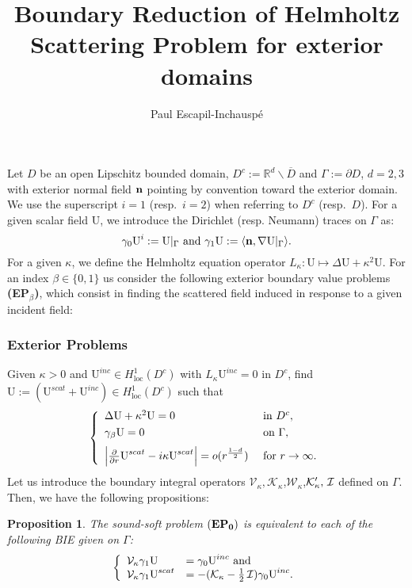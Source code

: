 \documentclass[1pt]{article}
\title{Boundary Reduction of Helmholtz Scattering Problem for exterior domains}
\author{Paul Escapil-Inchausp\'e}
\newcommand{\be}{\begin{equation}}
\newcommand{\ee}{\end{equation}}
\newcommand{\IR}{\mathbb{R}}
\newcommand{\bn}{{\bf n}}
\newcommand{\mK}{\mathcal{K}}
\newcommand{\mI}{\nobreak\hspace{.16667em plus .08333em}\mathcal{I}}
\newcommand{\mV}{\mathcal{V}}
\newcommand{\mW}{\mathcal{W}}
\newcommand{\U}{{\text{U}}}
\newtheorem{proposition}{Proposition}
\begin{document}
\maketitle

Let $D$ be an open Lipschitz bounded domain, $D^c:=\IR^d\backslash \overline{D}$ and $\Gamma:=\partial D$, $d=2,3$ with exterior normal field $\bn$ pointing by convention toward the exterior domain. We use the superscript $i=1$ (resp.~$i=2$) when referring to $D^c$ (resp.~$D$). For a given scalar field $\U$, we introduce the Dirichlet (resp. Neumann) traces on $\Gamma$ as:
\be
\gamma_0 \U^i:= \U|_\Gamma \text{ and } \gamma_1 \U:= \langle \bn, \nabla \U|_\Gamma  \rangle.
\ee
For a given $\kappa$, we define the Helmholtz equation operator $L_\kappa:\U \mapsto \Delta \U + \kappa^2 \U$. For an index $\beta \in \{0,1\}$ us consider the following exterior boundary value problems {\bf (EP$_\beta$)}, which consist in finding the scattered field induced in response to a given incident field:

\subsubsection*{Exterior Problems}
\label{subsubs:EP_0}
Given $\kappa>0$ and $\U^{inc} \in H_{\text{loc}}^1(D^c)$ with $L_\kappa \U^{inc}=0$ in $D^c$, find $\U:=(\U^{scat}+\U^{inc}) \in H_{\text{loc}}^1(D^c)$ such that
\be
\left\{
\label{eq:EP_0}
\begin{array}{ll}
\Delta\U+\kappa^2\U  = 0&\text{ in } D^c,\\
\noalign{\vspace{3pt}}
  \gamma_{\beta} \U = 0&\text{ on } \Gamma,\\
  \noalign{\vspace{6pt}}
   \Big|\frac{\partial}{\partial r} \U^{scat}-i\kappa \U^{scat}\Big| = o(r^{\frac{1-d}{2}}) &\text{ for } r \to \infty.
\end{array}
\right.
\ee
Let us introduce the boundary integral operators $\mV_\kappa,\mK_\kappa$,$\mW_\kappa$,$\mK_\kappa',\mI$ defined on $\Gamma$.
Then, we have the following propositions:
\begin{proposition}
The \emph{sound-soft} problem ${\bf (EP_0)}$ is equivalent to each of the following BIE given on $\Gamma$:
\be
\left\{
\label{eq:B_EP_0}
\begin{array}{ll}
\mathcal{V}_\kappa \gamma_1 \U &= \gamma_0 \U^{inc}\text{ and }\\
\mathcal{V}_\kappa \gamma_1 \U^{scat} &= -(\mathcal{K}_\kappa-\frac{1}{2}\mI) \gamma_0 \U^{inc}.
\end{array}
\right.
\ee
\end{proposition}
\end{document}
